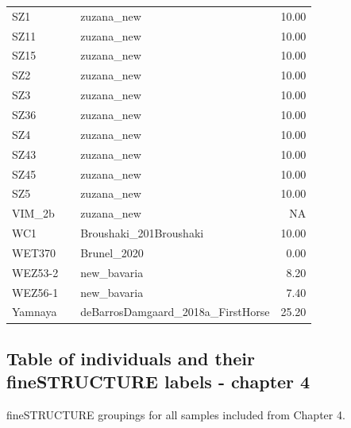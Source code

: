 \begin{longtable}[t]{lllr}
SZ1 &  & zuzana\_new & 10.00\\
SZ11 &  & zuzana\_new & 10.00\\
SZ15 &  & zuzana\_new & 10.00\\
SZ2 &  & zuzana\_new & 10.00\\
SZ3 &  & zuzana\_new & 10.00\\
SZ36 &  & zuzana\_new & 10.00\\
SZ4 &  & zuzana\_new & 10.00\\
SZ43 &  & zuzana\_new & 10.00\\
SZ45 &  & zuzana\_new & 10.00\\
SZ5 &  & zuzana\_new & 10.00\\
VIM\_2b &  & zuzana\_new & NA\\
WC1 &  & Broushaki\_201Broushaki & 10.00\\
WET370 &  & Brunel\_2020 & 0.00\\
WEZ53-2 &  & new\_bavaria & 8.20\\
WEZ56-1 &  & new\_bavaria & 7.40\\
Yamnaya &  & deBarrosDamgaard\_2018a\_FirstHorse & 25.20\\*
\end{longtable}
\endgroup{}


\subsection{Table of individuals and their fineSTRUCTURE labels - chapter 4} 
\label{sec:fs_bavaria_group}

fineSTRUCTURE groupings for all samples included from Chapter 4.


\begingroup\fontsize{9}{11}\selectfont

